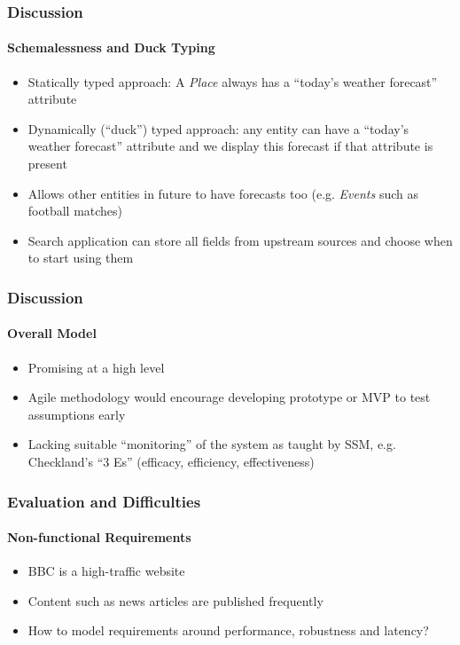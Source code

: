 \documentclass{beamer}
\begin{document}
\begin{frame}
  \frametitle{Discussion}
  \framesubtitle{Schemalessness and Duck Typing}
  \begin{itemize}
    \pause \item Statically typed approach: A \emph{Place} always has a ``today's weather forecast'' attribute
    \pause \item Dynamically (``duck'') typed approach: any entity can have a ``today's weather forecast'' attribute and we display this forecast if that attribute is present
    \pause \item Allows other entities in future to have forecasts too (e.g. \emph{Events} such as football matches)
    \pause \item Search application can store all fields from upstream sources and choose when to start using them
  \end{itemize}
\end{frame}

\begin{frame}
  \frametitle{Discussion}
  \framesubtitle{Overall Model}
  \begin{itemize}
    \pause \item Promising at a high level
    \pause \item Agile methodology would encourage developing prototype or MVP to test assumptions early
    \pause \item Lacking suitable ``monitoring'' of the system as taught by SSM, e.g. Checkland's ``3 Es'' (efficacy, efficiency, effectiveness)
  \end{itemize}
\end{frame}

\begin{frame}
  \frametitle{Evaluation and Difficulties}
  \framesubtitle{Non-functional Requirements}
  \begin{itemize}
    \pause \item BBC is a high-traffic website
    \pause \item Content such as news articles are published frequently
    \pause \item How to model requirements around performance, robustness and latency?
  \end{itemize}
\end{frame}
\end{document}
